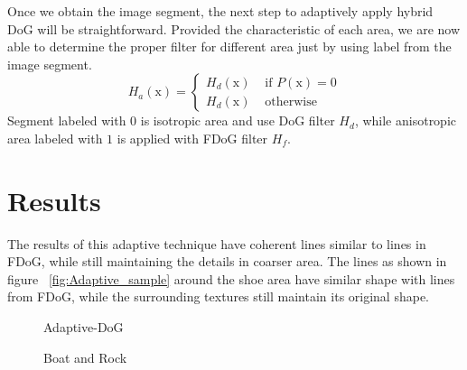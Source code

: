 Once we obtain the image segment, the next step to adaptively apply hybrid DoG will be straightforward. Provided the characteristic of each area, we are now able to determine the proper filter for different area just by using label from the image segment. 
\begin{equation}
	H_{a}(\mbox{x})=
		\left\{
			\begin{array}{ll}
				H_{d}(\mbox{x})&\mbox{ if }P(\mbox{x}) = 0
				\\
				H_{d}(\mbox{x})&\mbox{ otherwise }
			\end{array}
		\right.
\end{equation}
Segment labeled with $0$ is isotropic area and use DoG filter $H_{d}$, while anisotropic area labeled with $1$ is applied with FDoG filter $H_{f}$. 

\chapter{Results}
The results of this adaptive technique have coherent lines similar to lines in FDoG, while still maintaining the details in coarser area. The lines as shown in figure ~\ref{fig:Adaptive_sample} around the shoe area have similar shape with lines from FDoG, while the surrounding textures still maintain its original shape.

\begin{figure}[H]
	\centering
	\caption{Adaptive-DoG}\label{fig:Adaptive_DoG}
\end{figure}

\begin{figure}[H]
	\centering
	\caption{Boat and Rock}\label{fig:Compare1}
\end{figure}

